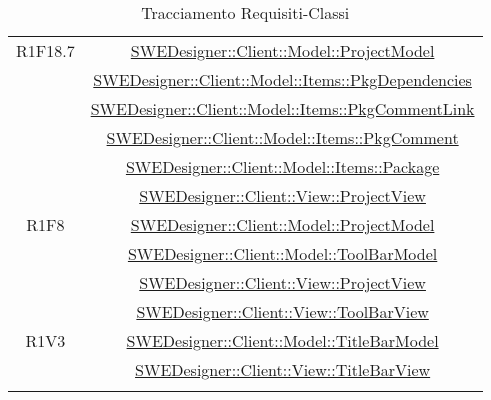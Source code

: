 \documentclass[../DefinizioneDiProdotto.tex]{subfiles}
\begin{document}
\begin{longtable}{|c|c|}
				R1F18.7
				& \hyperlink{SWEDesigner::Client::Model::ProjectModel}{SWEDesigner::Client::Model::ProjectModel}\\
				& \hyperlink{SWEDesigner::Client::Model::Items::PkgDependencies}{SWEDesigner::Client::Model::Items::PkgDependencies}\\
				& \hyperlink{SWEDesigner::Client::Model::Items::PkgCommentLink}{SWEDesigner::Client::Model::Items::PkgCommentLink}\\
				& \hyperlink{SWEDesigner::Client::Model::Items::PkgComment}{SWEDesigner::Client::Model::Items::PkgComment}\\
				& \hyperlink{SWEDesigner::Client::Model::Items::Package}{SWEDesigner::Client::Model::Items::Package}\\
				& \hyperlink{SWEDesigner::Client::View::ProjectView}{SWEDesigner::Client::View::ProjectView}\\
				\hline

				R1F8
				& \hyperlink{SWEDesigner::Client::Model::ProjectModel}{SWEDesigner::Client::Model::ProjectModel}\\
				& \hyperlink{SWEDesigner::Client::Model::ToolBarModel}{SWEDesigner::Client::Model::ToolBarModel}\\
				& \hyperlink{SWEDesigner::Client::View::ProjectView}{SWEDesigner::Client::View::ProjectView}\\
				& \hyperlink{SWEDesigner::Client::View::ToolBarView}{SWEDesigner::Client::View::ToolBarView}\\
				\hline

				R1V3
				& \hyperlink{SWEDesigner::Client::Model::TitleBarModel}{SWEDesigner::Client::Model::TitleBarModel}\\
				& \hyperlink{SWEDesigner::Client::View::TitleBarView}{SWEDesigner::Client::View::TitleBarView}\\
				\hline

				\caption[Tracciamento Requisiti-Classi]{Tracciamento Requisiti-Classi}
				\label{tabella:requi-classi}
			\end{longtable}
			\clearpage
\end{document}
